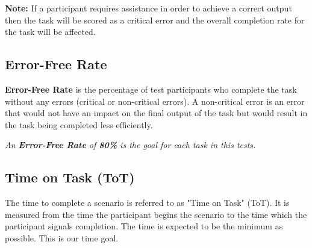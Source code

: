 
\textbf{Note:} If a participant requires assistance in order to achieve a correct output then the task will be scored as a critical error and the overall completion rate for the task will be affected.

\hfill



\subsection{Error-Free Rate}

\textbf{Error-Free Rate} is the percentage of test participants who complete the task without any errors (critical or non-critical errors). A non-critical error is an error that would not have an impact on the final output of the task but would result in the task being completed less efficiently.


\hfill

\textit{An \textbf{Error-Free Rate} of \textbf{80\%} is the goal for each task in this tests.}



\subsection{Time on Task (ToT)}

The time to complete a scenario is referred to as "Time on Task" (ToT). It is measured from the time the participant begins the scenario to the time which the participant signals completion. The time is expected to be the minimum as possible. This is our time goal.


